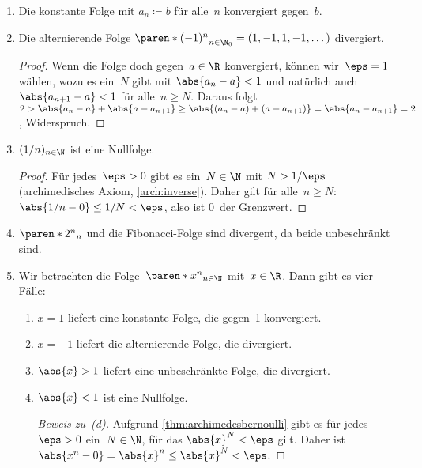 \documentclass[a4paper]{article}
\begin{document}
\begin{example}\leavevmode
    \begin{enumerate}
        \item Die konstante Folge mit $a_n \coloneqq b$ für alle~$n$ konvergiert gegen~$b$.
        \item Die alternierende Folge $\paren*{(-1)^n}_{n \in \N_0} = (1, -1, 1, -1, \dots)$ divergiert.
              \begin{proof}
                  Wenn die Folge doch gegen~$a \in \R$ konvergiert, können wir~$\eps = 1$ wählen, wozu es ein~$N$ gibt mit $\abs{a_n-a} < 1$ und natürlich auch $\abs{a_{n+1}-a} < 1$ für alle~$n \geq N$. Daraus folgt $2 > \abs{a_n-a} + \abs{a-a_{n+1}} \geq \abs{(a_n-a) + (a-a_{n+1})} = \abs{a_n-a_{n+1}} = 2$, Widerspruch.
              \end{proof}
        \item $(1/n)_{n \in \N}$ ist eine Nullfolge.
              \begin{proof}
                  Für jedes~$\eps > 0$ gibt es ein~$N \in \N$ mit $N > 1/\eps$ (archimedisches Axiom, \cref{arch:inverse}). Daher gilt für alle~$n \geq N$: $\abs{1/n-0} \leq 1/N < \eps$, also ist 0~der Grenzwert.
              \end{proof}
        \item $\paren*{2^n}_n$ und die Fibonacci-Folge sind divergent, da beide unbeschränkt sind.
        \item Wir betrachten die Folge~$\paren*{x^n}_{n\in\N}$ mit~$x \in \R$. Dann gibt es vier Fälle:
              \begin{enumerate}
                  \item $x = 1$ liefert eine konstante Folge, die gegen~1 konvergiert.
                  \item $x = -1$ liefert die alternierende Folge, die divergiert.
                  \item $\abs{x} > 1$ liefert eine unbeschränkte Folge, die divergiert.
                  \item $\abs{x} < 1$ ist eine Nullfolge.
                        \begin{proof}[Beweis zu~(d)]
                            Aufgrund \cref{thm:archimedesbernoulli} gibt es für jedes~$\eps > 0$ ein~$N \in \N$, für das $\abs{x}^N < \eps$ gilt. Daher ist $\abs{x^n-0} = \abs{x}^n \leq \abs{x}^N < \eps$.
                        \end{proof}
              \end{enumerate}
    \end{enumerate}
\end{example}
\end{document}
